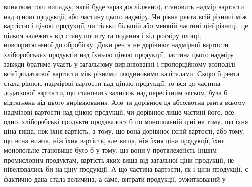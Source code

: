 винятком того випадку, який буде зараз досліджено), становить надмір вартости над ціною продукції,
або частину цього надміру. Чи рівна рента всій різниці між вартістю і ціною продукції, чи тільки
більшій або меншій частині цієї різниці, це цілком залежить від стану попиту та подання і від
розміру площі, новопритягненої до обробітку. Доки рента не дорівнює надмірної вартости хліборобських
продуктів над їхньою ціною продукції, частина цього надміру завжди братиме участь у загальному
вирівнюванні і пропорційному розподілі всієї додаткової вартости між різними поодинокими капіталами.
Скоро б рента стала рівною надмірові вартости над ціною продукції, то вся ця частина додаткової
вартости, що становить залишок над пересічним зиском, була б відтягнена від цього вирівнювання. Але
чи дорівнює ця абсолютна рента всьому надмірові вартости над ціною продукції, чи дорівнює лише
частині його, все
одно, хліборобські продукти продавалося б по монопольній ціні не тому, що
їхня ціна вища, ніж їхня вартість, а тому, що вона дорівнює їхній вартості,
або тому, що вона нижча, ніж їхня вартість, але вища, ніж їхня ціна продукції, їхнє монопольне
становище було б у тому, що вони у
протилежність іншим промисловим продуктам, вартість яких вища від загальної ціни продукції, не
нівелювались би на ціну продукції. А що частина вартости, як і ціни продукції, є фактично дана стала
величина, а саме, витрати продукції, зужиткований у
\parbreak{}  %
